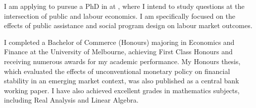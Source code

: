  I am applying to pursue a PhD in \program{} at \school, where I intend to study questions at the intersection of public and labour economics. I am specifically focused on the effects of public assistance and social program design on labour market outcomes.

 I completed a Bachelor of Commerce (Honours) majoring in Economics and Finance at the University of Melbourne, achieving First Class Honours and receiving numerous awards for my academic performance. My Honours thesis, which evaluated the effects of unconventional monetary policy on financial stability in an emerging market context, was also published as a central bank working paper. I have also achieved excellent grades in mathematics subjects, including Real Analysis and Linear Algebra.


